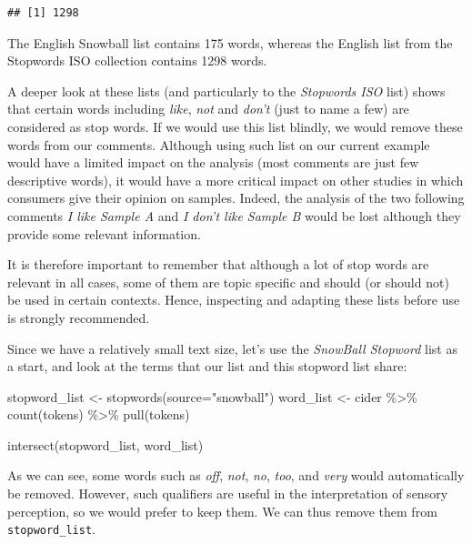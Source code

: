 \documentclass[
]{krantz}
\makeatletter
\newenvironment{Shaded}{\begin{snugshade}}{\end{snugshade}}
\newcommand{\AttributeTok}[1]{\textcolor[rgb]{0.61,0.61,0.61}{#1}}
\newcommand{\FunctionTok}[1]{\textcolor[rgb]{0,0,0}{#1}}
\newcommand{\NormalTok}[1]{#1}
\newcommand{\OtherTok}[1]{\textcolor[rgb]{0.37,0.37,0.37}{#1}}
\newcommand{\SpecialCharTok}[1]{\textcolor[rgb]{0,0,0}{#1}}
\newcommand{\StringTok}[1]{\textcolor[rgb]{0.5,0.5,0.5}{#1}}
\newenvironment{kframe}{%
\medskip{}
\setlength{\fboxsep}{.8em}
 \def\at@end@of@kframe{}%
 \ifinner\ifhmode%
  \def\at@end@of@kframe{\end{minipage}}%
  \begin{minipage}{\columnwidth}%
 \fi\fi%
 \def\FrameCommand##1{\hskip\@totalleftmargin \hskip-\fboxsep
 \colorbox{shadecolor}{##1}\hskip-\fboxsep
     \hskip-\linewidth \hskip-\@totalleftmargin \hskip\columnwidth}%
 \MakeFramed {\advance\hsize-\width
   \@totalleftmargin\z@ \linewidth\hsize
   \@setminipage}}%
 {\par\unskip\endMakeFramed%
 \at@end@of@kframe}
\renewenvironment{Shaded}{\begin{kframe}}{\end{kframe}}
\makeatother
\begin{document}
\begin{verbatim}
## [1] 1298
\end{verbatim}

The English Snowball list contains 175 words, whereas the English list from the Stopwords ISO collection contains 1298 words.

A deeper look at these lists (and particularly to the \emph{Stopwords ISO} list) shows that certain words including \emph{like}, \emph{not} and \emph{don't} (just to name a few) are considered as stop words. If we would use this list blindly, we would remove these words from our comments. Although using such list on our current example would have a limited impact on the analysis (most comments are just few descriptive words), it would have a more critical impact on other studies in which consumers give their opinion on samples. Indeed, the analysis of the two following comments \emph{I like Sample A} and \emph{I don't like Sample B} would be lost although they provide some relevant information.

It is therefore important to remember that although a lot of stop words are relevant in all cases, some of them are topic specific and should (or should not) be used in certain contexts. Hence, inspecting and adapting these lists before use is strongly recommended.

Since we have a relatively small text size, let's use the \emph{SnowBall Stopword} list as a start, and look at the terms that our list and this stopword list share:

\begin{Shaded}
\begin{Highlighting}[]
\NormalTok{stopword\_list }\OtherTok{\textless{}{-}} \FunctionTok{stopwords}\NormalTok{(}\AttributeTok{source=}\StringTok{"snowball"}\NormalTok{)}
\NormalTok{word\_list }\OtherTok{\textless{}{-}}\NormalTok{ cider }\SpecialCharTok{\%\textgreater{}\%} 
  \FunctionTok{count}\NormalTok{(tokens) }\SpecialCharTok{\%\textgreater{}\%} 
  \FunctionTok{pull}\NormalTok{(tokens)}

\FunctionTok{intersect}\NormalTok{(stopword\_list, word\_list)}
\end{Highlighting}
\end{Shaded}

As we can see, some words such as \emph{off}, \emph{not}, \emph{no}, \emph{too}, and \emph{very} would automatically be removed. However, such qualifiers are useful in the interpretation of sensory perception, so we would prefer to keep them. We can thus remove them from \texttt{stopword\_list}.
\end{document}
